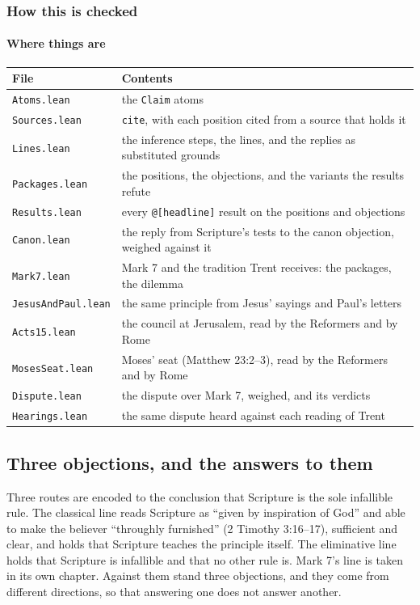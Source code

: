 \documentclass[11pt]{article}
\begin{document}
\subsubsection*{How this is checked}
\paragraph*{Where things are}
\leavevmode\par\nobreak
\begin{longtable}{@{}>{\raggedright\arraybackslash}p{} >{\raggedright\arraybackslash}p{}@{}}
\toprule
\textbf{File} & \textbf{Contents} \\
\midrule
\endhead
\texttt{Atoms.lean} & the \texttt{Claim} atoms \\
\texttt{Sources.lean} & \texttt{cite}, with each position cited from a source that holds it \\
\texttt{Lines.lean} & the inference steps, the lines, and the replies as substituted grounds \\
\texttt{Packages.lean} & the positions, the objections, and the variants the results refute \\
\texttt{Results.lean} & every \texttt{@[headline]} result on the positions and objections \\
\texttt{Canon.lean} & the reply from Scripture’s tests to the canon objection, weighed against it \\
\texttt{Mark7.lean} & Mark 7 and the tradition Trent receives: the packages, the dilemma \\
\texttt{Jesus\allowbreak{}And\allowbreak{}Paul.lean} & the same principle from Jesus’ sayings and Paul’s letters \\
\texttt{Acts15.lean} & the council at Jerusalem, read by the Reformers and by Rome \\
\texttt{Moses\allowbreak{}Seat.lean} & Moses’ seat (Matthew 23:2–3), read by the Reformers and by Rome \\
\texttt{Dispute.lean} & the dispute over Mark 7, weighed, and its verdicts \\
\texttt{Hearings.lean} & the same dispute heard against each reading of Trent \\
\bottomrule
\end{longtable}
\subsection*{Three objections, and the answers to them}
Three routes are encoded to the conclusion that Scripture is the sole infallible rule. The classical line reads Scripture as “given by inspiration of God” and able to make the believer “throughly furnished” (2 Timothy 3:16–17), sufficient and clear, and holds that Scripture teaches the principle itself. The eliminative line holds that Scripture is infallible and that no other rule is. Mark 7’s line is taken in its own chapter. Against them stand three objections, and they come from different directions, so that answering one does not answer another.
\end{document}
